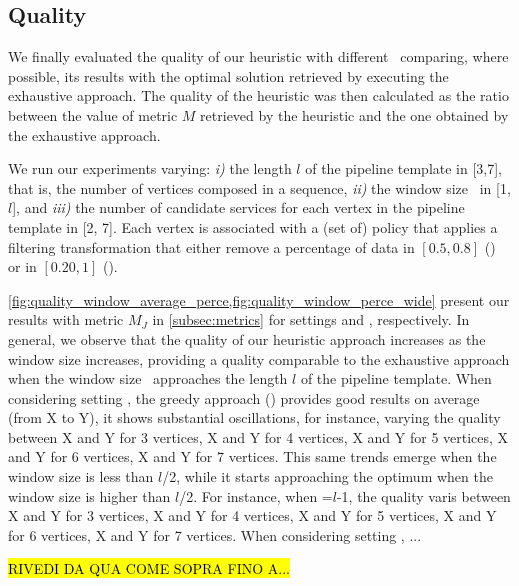 \subsection{Quality}\label{subsec:experiments_quality}
We finally evaluated the quality of our heuristic with different \windowsize\ comparing, where possible, its results with the optimal solution retrieved by executing the exhaustive approach. %
The quality of the heuristic was then calculated as the ratio between the value of metric $M$ retrieved by the heuristic and the one obtained by the exhaustive approach. 


We run our experiments varying: \emph{i)} the length $l$ of the pipeline template in [3,7], that is, the number of vertices composed in a sequence, \emph{ii)} the window size \windowsize\ in [1,$l$], and \emph{iii)} the number of candidate services for each vertex in the pipeline template in [2, 7]. Each vertex is associated with a (set of) policy that applies a filtering transformation that either remove a percentage of data in $[0.5,0.8]$ (\average) or in $[0.20,1]$ (\wide).



\cref{fig:quality_window_average_perce,fig:quality_window_perce_wide} present our results with metric $M_J$ in \cref{subsec:metrics} for settings \wide and \average, respectively.
In general, we observe that the quality of our heuristic approach increases as the window size increases, providing a quality comparable to the exhaustive approach when the window size \windowsize\ approaches the length $l$ of the pipeline template. 
When considering setting \wide, the greedy approach () provides good results on average (from X to Y), it shows substantial oscillations, for instance, varying the quality between X and Y for 3 vertices, X and Y for 4 vertices, X and Y for 5 vertices, X and Y for 6 vertices, X and Y for 7 vertices. This same trends emerge when the window size is less than $l$/2, while it starts approaching the optimum when the window size is higher than $l$/2. For instance, when \windowsize=$l$-1, the quality varis between X and Y for 3 vertices, X and Y for 4 vertices, X and Y for 5 vertices, X and Y for 6 vertices, X and Y for 7 vertices.
When considering setting \average, ...

\hl{RIVEDI DA QUA COME SOPRA FINO A...}

